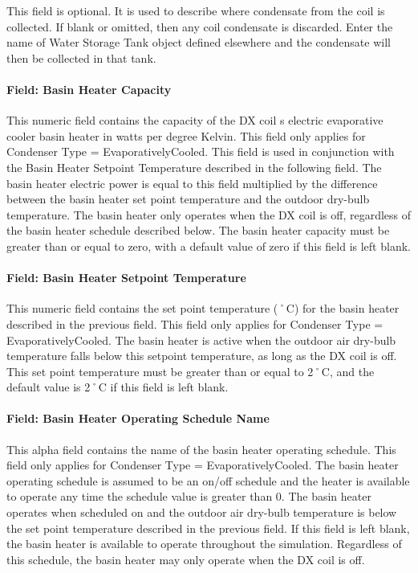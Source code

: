 This field is optional. It is used to describe where condensate from the coil is collected. If blank or omitted, then any coil condensate is discarded. Enter the name of Water Storage Tank object defined elsewhere and the condensate will then be collected in that tank.

\paragraph{Field: Basin Heater Capacity}\label{field-basin-heater-capacity-000}

This numeric field contains the capacity of the DX coil s electric evaporative cooler basin heater in watts per degree Kelvin. This field only applies for Condenser Type = EvaporativelyCooled. This field is used in conjunction with the Basin Heater Setpoint Temperature described in the following field. The basin heater electric power is equal to this field multiplied by the difference between the basin heater set point temperature and the outdoor dry-bulb temperature. The basin heater only operates when the DX coil is off, regardless of the basin heater schedule described below. The basin heater capacity must be greater than or equal to zero, with a default value of zero if this field is left blank.

\paragraph{Field: Basin Heater Setpoint Temperature}\label{field-basin-heater-setpoint-temperature-000}

This numeric field contains the set point temperature (˚C) for the basin heater described in the previous field. This field only applies for Condenser Type = EvaporativelyCooled. The basin heater is active when the outdoor air dry-bulb temperature falls below this setpoint temperature, as long as the DX coil is off. This set point temperature must be greater than or equal to 2˚C, and the default value is 2˚C if this field is left blank.

\paragraph{Field: Basin Heater Operating Schedule Name}\label{field-basin-heater-operating-schedule-name-000}

This alpha field contains the name of the basin heater operating schedule. This field only applies for Condenser Type = EvaporativelyCooled. The basin heater operating schedule is assumed to be an on/off schedule and the heater is available to operate any time the schedule value is greater than 0. The basin heater operates when scheduled on and the outdoor air dry-bulb temperature is below the set point temperature described in the previous field. If this field is left blank, the basin heater is available to operate throughout the simulation. Regardless of this schedule, the basin heater may only operate when the DX coil is off.

